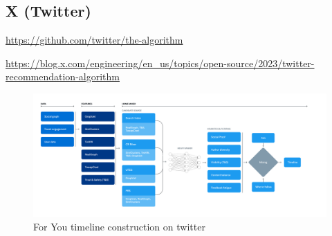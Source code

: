 \subsection{X (Twitter)}\label{cnn/xalgorithm}

\url{https://github.com/twitter/the-algorithm}

\url{https://blog.x.com/engineering/en_us/topics/open-source/2023/twitter-recommendation-algorithm}

\begin{figure}[h]
    \centering
    \includegraphics[width=1\linewidth]{Images/xalgorithm-1.png}
    \caption{For You timeline construction on twitter \cite{twitter_algorithm_diagram}}
    \label{fig:xalgorithm-1}
\end{figure}